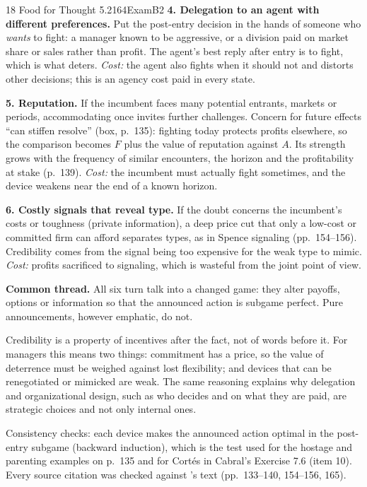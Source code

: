 \begin{exsol}{18}{\MR{} Food for Thought 5.2}{164}{Exam}{B2}
\textbf{4. Delegation to an agent with different preferences.} Put the post-entry decision in the
hands of someone who \emph{wants} to fight: a manager known to be aggressive, or a division paid on
market share or sales rather than profit. The agent's best reply after entry is to fight, which
is what deters. \emph{Cost:} the agent also fights when it should not and distorts other
decisions; this is an agency cost paid in every state.

\textbf{5. Reputation.} If the incumbent faces many potential entrants, markets or periods,
accommodating once invites further challenges. Concern for future effects ``can stiffen resolve''
(box, p.~135): fighting today protects profits elsewhere, so the comparison becomes $F$ plus
the value of reputation against $A$. Its strength grows with the frequency of similar
encounters, the horizon and the profitability at stake (p.~139). \emph{Cost:} the incumbent must
actually fight sometimes, and the device weakens near the end of a known horizon.

\textbf{6. Costly signals that reveal type.} If the doubt concerns the incumbent's costs or
toughness (private information), a deep price cut that only a low-cost or committed firm can
afford separates types, as in Spence signaling (pp.~154--156). Credibility comes from the
signal being too expensive for the weak type to mimic. \emph{Cost:} profits sacrificed to
signaling, which is wasteful from the joint point of view.

\textbf{Common thread.} All six turn talk into a changed game: they alter payoffs, options or
information so that the announced action is subgame perfect. Pure announcements, however
emphatic, do not.

\interp Credibility is a property of incentives after the fact, not of words before it. For
managers this means two things: commitment has a price, so the value of deterrence must be weighed
against lost flexibility; and devices that can be renegotiated or mimicked are weak. The same
reasoning explains why delegation and organizational design, such as who decides and on what they
are paid, are strategic choices and not only internal ones.

\verify Consistency checks: each device makes the announced action optimal in the post-entry
subgame (backward induction), which is the test used for the hostage and parenting examples on
p.~135 and for Cort\'es in Cabral's Exercise 7.6 (item 10). Every source citation was checked
against \MR's text (pp.~133--140, 154--156, 165).

\end{exsol}
